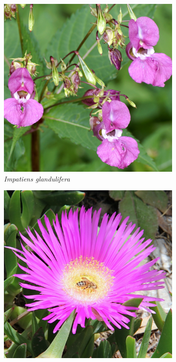 \documentclass[a4paper]{article}
\begin{document}
\begin{figure}
    \centering
    \begin{subfigure}{0.3\textwidth}
        \centering
        \includegraphics[width=\textwidth]{Impatiens_glandulifera}
        \caption{\textit{Impatiens glandulifera}}
    \end{subfigure}
    \hfill
    \begin{subfigure}{0.3\textwidth}
        \centering
        \includegraphics[width=\textwidth]{Carpobrotus_acinaciformis}

\end{subfigure}
\end{figure}
\end{document}
